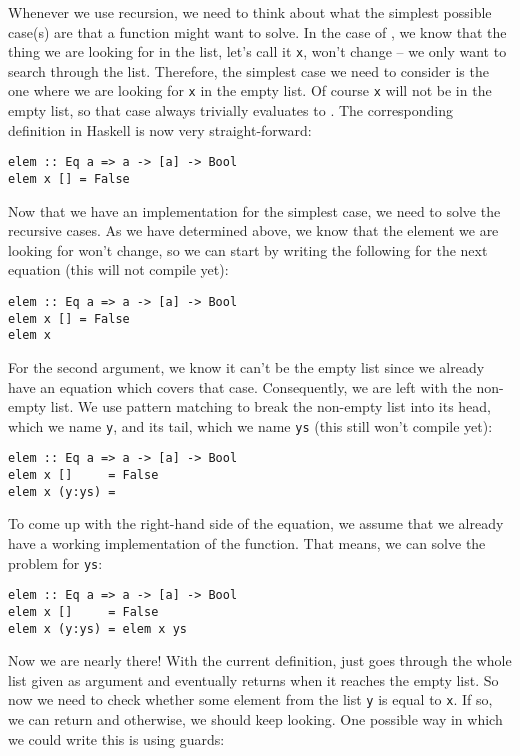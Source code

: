 Whenever we use recursion, we need to think about what the simplest possible case(s) are that a function might want to solve. In the case of , we know that the thing we are looking for in the list, let's call it \texttt{\small x}, won't change -- we only want to search through the list. Therefore, the simplest case we need to consider is the one where we are looking for \texttt{\small x} in the empty list. Of course \texttt{\small x} will not be in the empty list, so that case always trivially evaluates to . The corresponding definition in Haskell is now very straight-forward: 
\begin{verbatim}
elem :: Eq a => a -> [a] -> Bool
elem x [] = False
\end{verbatim}
Now that we have an implementation for the simplest case, we need to solve the recursive cases. As we have determined above, we know that the element we are looking for won't change, so we can start by writing the following for the next equation (this will not compile yet): 
\begin{verbatim}
elem :: Eq a => a -> [a] -> Bool
elem x [] = False
elem x
\end{verbatim}
For the second argument, we know it can't be the empty list since we already have an equation which covers that case. Consequently, we are left with the non-empty list. We use pattern matching to break the non-empty list into its head, which we name \texttt{\small y}, and its tail, which we name \texttt{\small ys} (this still won't compile yet):
\begin{verbatim}
elem :: Eq a => a -> [a] -> Bool
elem x []     = False
elem x (y:ys) =
\end{verbatim}
To come up with the right-hand side of the equation, we assume that we already have a working implementation of the  function. That means, we can solve the problem for \texttt{\small ys}:
\begin{verbatim}
elem :: Eq a => a -> [a] -> Bool
elem x []     = False
elem x (y:ys) = elem x ys
\end{verbatim}
Now we are nearly there! With the current definition,  just goes through the whole list given as argument and eventually returns  when it reaches the empty list. So now we need to check whether some element from the list \texttt{\small y} is equal to \texttt{\small x}. If so, we can return  and otherwise, we should keep looking. One possible way in which we could write this is using guards:
